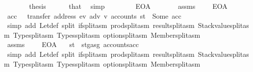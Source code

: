 \begin{isabellebody}
\ \ \ \ \isamarkupfalse%
\ \isamarkupfalse%
\ {\isacharquery}{\kern0pt}thesis\ \isamarkupfalse%
\ {}\ {}\ {}\ {}\ that{\isacharparenleft}{\kern0pt}{}{\isacharparenright}{\kern0pt}\ \isamarkupfalse%
\ simp\isanewline
\ \ \isamarkupfalse%
\isanewline
\ \ \ \ \isamarkupfalse%
\ EOA\isanewline
\ \ \ \ \isamarkupfalse%
\ \isamarkupfalse%
\ assms\ {}\ {}\ {}\ {}\ EOA\ \isamarkupfalse%
\ acc\ \ {}{\isacharcolon}{\kern0pt}\ {\isachardoublequoteopen}transfer\ {\isacharparenleft}{\kern0pt}address\ ev{\isacharparenright}{\kern0pt}\ adv\ v{\isacharprime}{\kern0pt}\ {\isacharparenleft}{\kern0pt}accounts\ st{\isacharparenright}{\kern0pt}\ {\isacharequal}{\kern0pt}\ Some\ acc{\isachardoublequoteclose}\ \isamarkupfalse%
\ {\isacharparenleft}{\kern0pt}simp\ add{\isacharcolon}{\kern0pt}\ Let{\isacharunderscore}{\kern0pt}def\ split{\isacharcolon}{\kern0pt}\ if{\isacharunderscore}{\kern0pt}split{\isacharunderscore}{\kern0pt}asm\ prod{\isachardot}{\kern0pt}split{\isacharunderscore}{\kern0pt}asm\ result{\isachardot}{\kern0pt}split{\isacharunderscore}{\kern0pt}asm\ Stackvalue{\isachardot}{\kern0pt}split{\isacharunderscore}{\kern0pt}asm\ Type{\isachardot}{\kern0pt}split{\isacharunderscore}{\kern0pt}asm\ Types{\isachardot}{\kern0pt}split{\isacharunderscore}{\kern0pt}asm\ option{\isachardot}{\kern0pt}split{\isacharunderscore}{\kern0pt}asm\ Member{\isachardot}{\kern0pt}split{\isacharunderscore}{\kern0pt}asm{\isacharparenright}{\kern0pt}\isanewline
\ \ \ \ \isamarkupfalse%
\ \isamarkupfalse%
\ assms\ {}\ {}\ {}\ {}\ EOA\ {}\ \isamarkupfalse%
\ {\isachardoublequoteopen}st{\isacharprime}{\kern0pt}\ {\isacharequal}{\kern0pt}\ st{\isasymlparr}gas{\isacharcolon}{\kern0pt}{\isacharequal}{\kern0pt}g{\isacharprime}{\kern0pt}{\isacharcomma}{\kern0pt}\ accounts{\isacharcolon}{\kern0pt}{\isacharequal}{\kern0pt}acc{\isasymrparr}{\isachardoublequoteclose}\ \isamarkupfalse%
\ {\isacharparenleft}{\kern0pt}simp\ add{\isacharcolon}{\kern0pt}\ Let{\isacharunderscore}{\kern0pt}def\ split{\isacharcolon}{\kern0pt}\ if{\isacharunderscore}{\kern0pt}split{\isacharunderscore}{\kern0pt}asm\ prod{\isachardot}{\kern0pt}split{\isacharunderscore}{\kern0pt}asm\ result{\isachardot}{\kern0pt}split{\isacharunderscore}{\kern0pt}asm\ Stackvalue{\isachardot}{\kern0pt}split{\isacharunderscore}{\kern0pt}asm\ Type{\isachardot}{\kern0pt}split{\isacharunderscore}{\kern0pt}asm\ Types{\isachardot}{\kern0pt}split{\isacharunderscore}{\kern0pt}asm\ option{\isachardot}{\kern0pt}split{\isacharunderscore}{\kern0pt}asm\ Member{\isachardot}{\kern0pt}split{\isacharunderscore}{\kern0pt}asm{\isacharparenright}{\kern0pt}\isanewline

\end{isabellebody}
